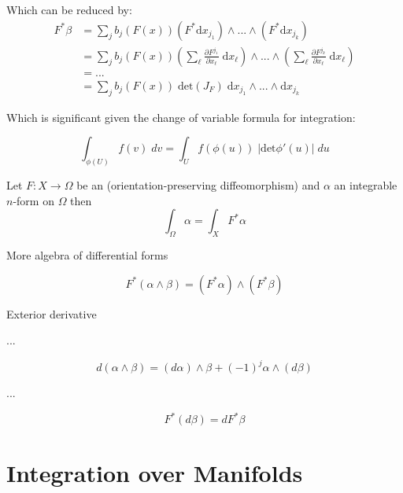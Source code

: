 Which can be reduced by:
\begin{align}
F^ * \beta & = \sum_j  b_j ( F(x)) (F^* \text{d}x_{j_1}) \wedge ... \wedge (F^* \text{d} x_{j_k}) \\
& = \sum_j  b_j ( F(x))  
\left( \sum_\ell \frac{\partial F^{j_1}}{\partial x_\ell} \; \text{d} x_\ell \right)
\wedge ... \wedge  
\left( \sum_\ell \frac{\partial F^{j_k}}{\partial x_\ell} \; \text{d} x_\ell \right) \\
& = ... \\
& = \sum_j b_j ( F(x)) \; \text{det}\left( J_F \right) \; \text{d}x_{j_1} \wedge ... \wedge \text{d} x_{j_k}
\end{align}

Which is significant given the change of variable formula for integration:

\begin{equation}
\int_{\phi(U)} \! f(v) \; dv = \int_U \! f(\phi(u)) \; |\text{det}\phi'(u)| \; du
\end{equation}

\begin{theorem}
Let $F : X  \to \Omega$ be an (orientation-preserving diffeomorphism) and $\alpha$ an integrable $n$-form on $\Omega$ then
\begin{equation}
\int_\Omega \alpha = \int_X F^* \alpha
\end{equation}
\end{theorem}

More algebra of differential forms

\begin{equation}
F^* (\alpha \wedge \beta ) = (F^* \alpha) \wedge (F^* \beta)
\end{equation}

\begin{definition}
Exterior derivative
\end{definition}

...

\begin{equation}
d(\alpha \wedge \beta) = (d \alpha) \wedge \beta + (-1)^j \alpha \wedge ( d \beta)
\end{equation}

...

\begin{equation}
F^* (d \beta ) = dF^* \beta
\end{equation}


%
%
\section{Integration over Manifolds}

